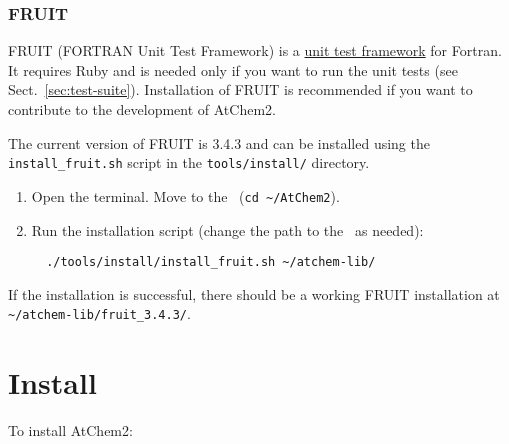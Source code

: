 \subsubsection{FRUIT}

FRUIT (FORTRAN Unit Test Framework) is a
\href{https://en.wikipedia.org/wiki/Unit_testing}{unit test framework}
for Fortran. It requires Ruby and is needed only if you want to run
the unit tests (see Sect.~\ref{sec:test-suite}). Installation of FRUIT
is recommended if you want to contribute to the development of
AtChem2.

The current version of FRUIT is 3.4.3 and can be installed using the
\texttt{install\_fruit.sh} script in the \texttt{tools/install/}
directory.

\begin{enumerate}
\item Open the terminal. Move to the \maindir\ (\verb|cd ~/AtChem2|).
\item Run the installation script (change the path to the \depdir\ as
  needed):
  \begin{verbatim}
  ./tools/install/install_fruit.sh ~/atchem-lib/
  \end{verbatim}
\end{enumerate}

If the installation is successful, there should be a working FRUIT
installation at
\texttt{\textasciitilde{}/atchem-lib/fruit\_3.4.3/}.

\section{Install} \label{sec:install}

To install AtChem2:

